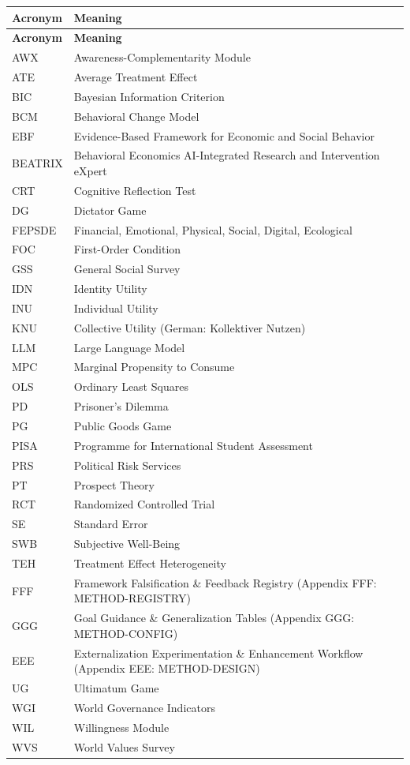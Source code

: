 \begin{center}
\renewcommand{\arraystretch}{1.2}
\begin{longtable}{lp{10cm}}
\hline
\textbf{Acronym} & \textbf{Meaning} \\
\hline
\endfirsthead
\hline
\textbf{Acronym} & \textbf{Meaning} \\
\hline
\endhead
\hline
\endfoot

AWX & Awareness-Complementarity Module \\
ATE & Average Treatment Effect \\
BIC & Bayesian Information Criterion \\
BCM & Behavioral Change Model \\
EBF & Evidence-Based Framework for Economic and Social Behavior \\
BEATRIX & Behavioral Economics AI-Integrated Research and Intervention eXpert \\
CRT & Cognitive Reflection Test \\
DG & Dictator Game \\
FEPSDE & Financial, Emotional, Physical, Social, Digital, Ecological \\
FOC & First-Order Condition \\
GSS & General Social Survey \\
IDN & Identity Utility \\
INU & Individual Utility \\
KNU & Collective Utility (German: Kollektiver Nutzen) \\
LLM & Large Language Model \\
MPC & Marginal Propensity to Consume \\
OLS & Ordinary Least Squares \\
PD & Prisoner's Dilemma \\
PG & Public Goods Game \\
PISA & Programme for International Student Assessment \\
PRS & Political Risk Services \\
PT & Prospect Theory \\
RCT & Randomized Controlled Trial \\
SE & Standard Error \\
SWB & Subjective Well-Being \\
TEH & Treatment Effect Heterogeneity \\
FFF & Framework Falsification \& Feedback Registry (Appendix FFF: METHOD-REGISTRY) \\
GGG & Goal Guidance \& Generalization Tables (Appendix GGG: METHOD-CONFIG) \\
EEE & Externalization Experimentation \& Enhancement Workflow (Appendix EEE: METHOD-DESIGN) \\
UG & Ultimatum Game \\
WGI & World Governance Indicators \\
WIL & Willingness Module \\
WVS & World Values Survey \\
\hline

\end{longtable}
\end{center}

